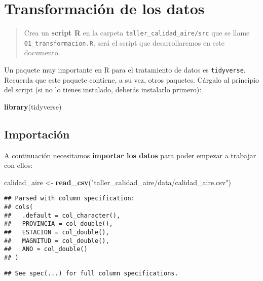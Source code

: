 \documentclass[]{article}
\newenvironment{Shaded}{\begin{snugshade}}{\end{snugshade}}
\newcommand{\KeywordTok}[1]{\textcolor[rgb]{0.13,0.29,0.53}{\textbf{#1}}}
\newcommand{\NormalTok}[1]{#1}
\newcommand{\StringTok}[1]{\textcolor[rgb]{0.31,0.60,0.02}{#1}}
\begin{document}
\hypertarget{transformacion-de-los-datos}{%
\section{Transformación de los
datos}\label{transformacion-de-los-datos}}

\begin{quote}
Crea un \textbf{script R} en la carpeta
\texttt{taller\_calidad\_aire/src} que se llame
\texttt{01\_transformacion.R}; será el script que desarrollaremos en
este documento.
\end{quote}

Un paquete muy importante en R para el tratamiento de datos es
\texttt{tidyverse}. Recuerda que este paquete contiene, a su vez, otros
paquetes. Cárgalo al principio del script (si no lo tienes instalado,
deberás instalarlo primero):

\begin{Shaded}
\begin{Highlighting}[]
\KeywordTok{library}\NormalTok{(tidyverse)}
\end{Highlighting}
\end{Shaded}

\hypertarget{importacion}{%
\subsection{Importación}\label{importacion}}

A continuación necesitamos \textbf{importar los datos} para poder
empezar a trabajar con ellos:

\begin{Shaded}
\begin{Highlighting}[]
\NormalTok{calidad_aire <-}\StringTok{ }\KeywordTok{read_csv}\NormalTok{(}\StringTok{"taller_calidad_aire/data/calidad_aire.csv"}\NormalTok{)}
\end{Highlighting}
\end{Shaded}

\begin{verbatim}
## Parsed with column specification:
## cols(
##   .default = col_character(),
##   PROVINCIA = col_double(),
##   ESTACION = col_double(),
##   MAGNITUD = col_double(),
##   ANO = col_double()
## )
\end{verbatim}

\begin{verbatim}
## See spec(...) for full column specifications.
\end{verbatim}
\end{document}
